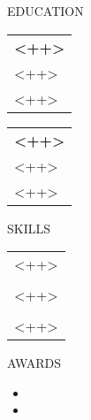 \documentclass[11pt]{article}
\newcommand{\titl}[1]
{{\Large#1} \\}
\newcommand{\smallcol}[3]
{\begin{tabular*}{\linewidth}{l}
  \rule{0pt}{17pt}
{\large\textbf{#1}} \\
{ #2} \\
{ #3} 
\end{tabular*}}
\begin{document}
\begin{minipage}[t]{.3\textwidth} %
  \vspace{2em} 
  \titl{\textsc{EDUCATION}} %
  \smallcol{\textsc{<++>}}{<++>}{<++>} %
  \smallcol{\textsc{<++>}}{<++>}{<++>} %

  \vspace{1em}
  \titl{\textsc{SKILLS}} %
  \begin{tabular*}{\textwidth}{l} %
    \rule{0pt}{17pt}
    <++> %
    \\
    \vspace{-0.9em}
    \\
    <++> %
    \\
    \vspace{-0.9em}
    \\
    <++> %
  \end{tabular*}

  \vspace{1em}
  \titl{\textsc{AWARDS}} %
  \begin{itemize}
    \item <++>
    \item <++>
  \end{itemize}

\end{minipage}
\end{document}
